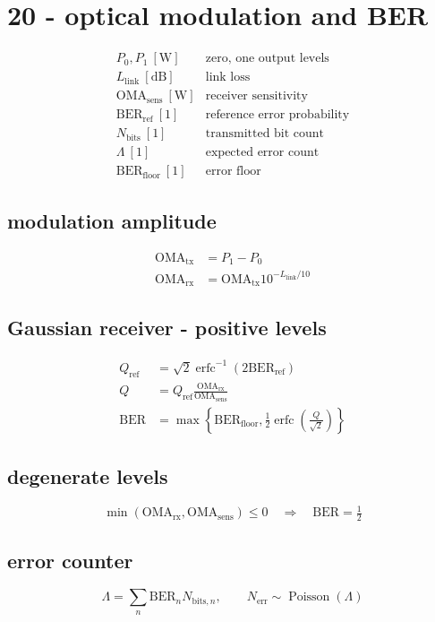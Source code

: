 \section*{20 - optical modulation and BER}

\[
\begin{array}{ll}P_0,P_1\ [\mathrm W]&\text{zero, one output levels}\\[0.6em]L_{\mathrm{link}}\ [\mathrm{dB}]&\text{link loss}\\[0.6em]\mathrm{OMA}_{\mathrm{sens}}\ [\mathrm W]&\text{receiver sensitivity}\\[0.6em]\mathrm{BER}_{\mathrm{ref}}\ [1]&\text{reference error probability}\\[0.6em]N_{\mathrm{bits}}\ [1]&\text{transmitted bit count}\\[0.6em]\Lambda\ [1]&\text{expected error count}\\[0.6em]\mathrm{BER}_{\mathrm{floor}}\ [1]&\text{error floor}\end{array}
\]

\subsection*{modulation amplitude}
\[
\displaystyle \begin{aligned}\mathrm{OMA}_{\mathrm{tx}}&=P_1-P_0\\\mathrm{OMA}_{\mathrm{rx}}&=\mathrm{OMA}_{\mathrm{tx}}10^{-L_{\mathrm{link}}/10}\end{aligned}
\]

\subsection*{Gaussian receiver - positive levels}
\[
\displaystyle \begin{aligned}Q_{\mathrm{ref}}&=\sqrt2\operatorname{erfc}^{-1}(2\mathrm{BER}_{\mathrm{ref}})\\Q&=Q_{\mathrm{ref}}\frac{\mathrm{OMA}_{\mathrm{rx}}}{\mathrm{OMA}_{\mathrm{sens}}}\\\mathrm{BER}&=\max\!\left\{\mathrm{BER}_{\mathrm{floor}},\frac12\operatorname{erfc}\!\left(\frac Q{\sqrt2}\right)\right\}\end{aligned}
\]

\subsection*{degenerate levels}
\[
\displaystyle \min(\mathrm{OMA}_{\mathrm{rx}},\mathrm{OMA}_{\mathrm{sens}})\le0\quad\Rightarrow\quad\mathrm{BER}=\tfrac12
\]

\subsection*{error counter}
\[
\displaystyle \Lambda=\sum_n\mathrm{BER}_n N_{\mathrm{bits},n},\qquad N_{\mathrm{err}}\sim\operatorname{Poisson}(\Lambda)
\]
